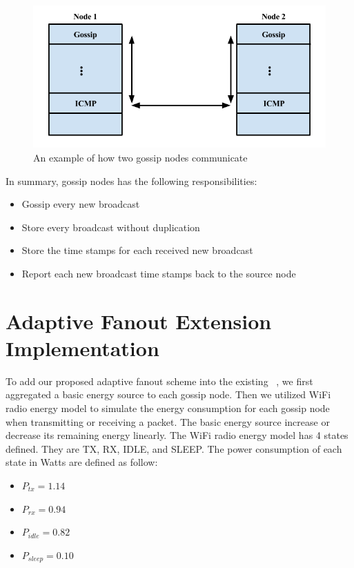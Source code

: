\begin{figure}
	\centering
	\includegraphics[width=5.5in]{topDown.png}
	\caption{An example of how two gossip nodes communicate}
	\label{fig:topDown}
\end{figure}

In summary, gossip nodes has the following responsibilities:
\begin{itemize}
	\item Gossip every new broadcast \msg
	\item Store every broadcast \msg without duplication
	\item Store the time stamps for each received new broadcast \msg
	\item Report each new broadcast \msg time stamps back to the source node
\end{itemize}

\section{Adaptive Fanout Extension Implementation}

To add our proposed adaptive fanout scheme into the existing \pp ~\gp, we first aggregated a basic energy source to each gossip node. Then we utilized WiFi radio energy model to simulate the energy consumption for each gossip node when transmitting or receiving a packet. The basic energy source increase or decrease its remaining energy linearly. The WiFi radio energy model has 4 states defined. They are TX, RX, IDLE, and SLEEP. The power consumption of each state in Watts are defined as follow:

\begin{itemize}
	\item $P_{tx}=1.14$
	\item $P_{rx}=0.94$
	\item $P_{idle}=0.82$
	\item $P_{sleep}=0.10$
\end{itemize}

